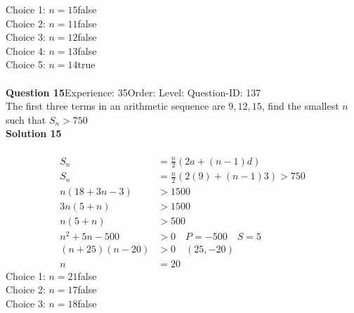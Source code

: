 \documentclass{article}
\begin{document}
Choice 1: \hspace{20pt}$n=15$\hspace{20pt}false\\
Choice 2: \hspace{20pt}$n=11$\hspace{20pt}false\\
Choice 3: \hspace{20pt}$n=12$\hspace{20pt}false\\
Choice 4: \hspace{20pt}$n=13$\hspace{20pt}false\\
Choice 5: \hspace{20pt}$n=14$\hspace{20pt}true\\
\\[4pt]
\noindent\textbf{Question 15}\hspace{20pt}Experience: 35\hspace{20pt}Order: \hspace{20pt}Level: \hspace{20pt}Question-ID: 137\\[2pt]
The first three terms in an arithmetic sequence are $9,12,15$, find the smallest $n$ such that $S_n > 750$\\[4pt]
\noindent\textbf{Solution 15}\\[2pt]
\\[-35pt]\begin{align*}
S_n&=\displaystyle\frac{n}{2}(2a+(n-1)d)\\[2pt]
S_n&=\displaystyle\frac{n}{2}(2(9)+(n-1)3)>750\\[2pt]
n(18+3n-3)&>1500\\[2pt]
3n(5+n)&>1500\\[2pt]
n(5+n)&>500\\[2pt]
n^2+5n-500&>0 \quad P=-500\quad S=5\\[2pt]
(n+25)(n-20)&>0 \quad (25,-20)\\[2pt]
n&=20
\end{align*}
Choice 1: \hspace{20pt}$n=21$\hspace{20pt}false\\
Choice 2: \hspace{20pt}$n=17$\hspace{20pt}false\\
Choice 3: \hspace{20pt}$n=18$\hspace{20pt}false\\
\end{document}
